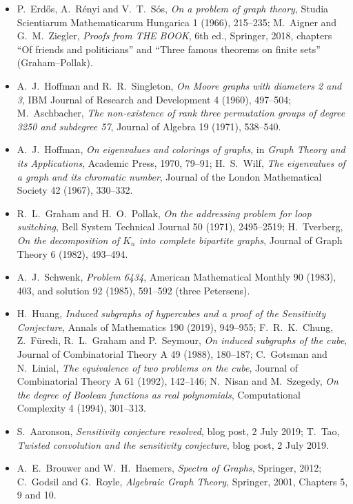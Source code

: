 \begin{itemize}
\item P.~Erd\H{o}s, A.~R\'enyi and V.~T.~S\'os, \emph{On a problem of graph theory}, Studia Scientiarum Mathematicarum Hungarica 1
(1966), 215--235; M.~Aigner and G.~M.~Ziegler, \emph{Proofs from THE BOOK}, 6th ed., Springer, 2018, chapters ``Of friends and
politicians'' and ``Three famous theorems on finite sets'' (Graham--Pollak).
\item A.~J.~Hoffman and R.~R.~Singleton, \emph{On Moore graphs with diameters 2 and 3}, IBM Journal of Research and Development 4 (1960),
497--504; M.~Aschbacher, \emph{The non-existence of rank three permutation groups of degree 3250 and subdegree 57}, Journal of Algebra 19
(1971), 538--540.
\item A.~J.~Hoffman, \emph{On eigenvalues and colorings of graphs}, in \emph{Graph Theory and its Applications}, Academic Press, 1970,
79--91; H.~S.~Wilf, \emph{The eigenvalues of a graph and its chromatic number}, Journal of the London Mathematical Society 42 (1967),
330--332.
\item R.~L.~Graham and H.~O.~Pollak, \emph{On the addressing problem for loop switching}, Bell System Technical Journal 50 (1971),
2495--2519; H.~Tverberg, \emph{On the decomposition of $K_n$ into complete bipartite graphs}, Journal of Graph Theory 6 (1982), 493--494.
\item A.~J.~Schwenk, \emph{Problem 6434}, American Mathematical Monthly 90 (1983), 403, and solution 92 (1985), 591--592 (three Petersens).
\item H.~Huang, \emph{Induced subgraphs of hypercubes and a proof of the Sensitivity Conjecture}, Annals of Mathematics 190 (2019),
949--955; F.~R.~K.~Chung, Z.~F\"uredi, R.~L.~Graham and P.~Seymour, \emph{On induced subgraphs of the cube}, Journal of Combinatorial
Theory A 49 (1988), 180--187; C.~Gotsman and N.~Linial, \emph{The equivalence of two problems on the cube}, Journal of Combinatorial Theory
A 61 (1992), 142--146; N.~Nisan and M.~Szegedy, \emph{On the degree of Boolean functions as real polynomials}, Computational Complexity 4
(1994), 301--313.
\item S.~Aaronson, \emph{Sensitivity conjecture resolved}, blog post, 2 July 2019; T.~Tao, \emph{Twisted convolution and the sensitivity
conjecture}, blog post, 2 July 2019.
\item A.~E.~Brouwer and W.~H.~Haemers, \emph{Spectra of Graphs}, Springer, 2012; C.~Godsil and G.~Royle, \emph{Algebraic Graph Theory},
Springer, 2001, Chapters 5, 9 and 10.
\end{itemize}
